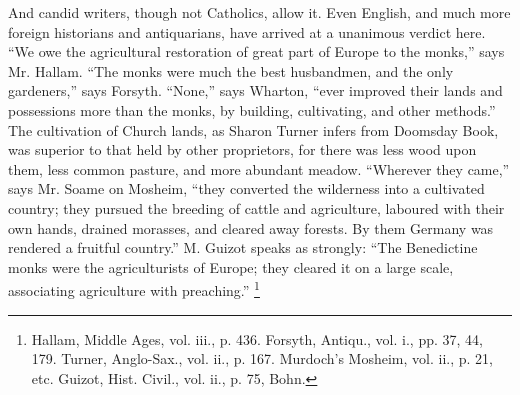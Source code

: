 And candid writers, though not Catholics, allow it. Even English,
and much more foreign historians and antiquarians, have arrived at a
unanimous verdict here. ``We owe the agricultural restoration of
great part of Europe to the monks,'' says Mr. Hallam. ``The
monks were much the best husbandmen, and the only gardeners,''
says Forsyth. ``None,'' says Wharton, ``ever improved
their lands and possessions more than the monks, by building,
cultivating, and other methods.'' The cultivation of Church lands,
as Sharon Turner infers from Doomsday Book, was superior to that held
by other proprietors, for there was less wood upon them, less common
pasture, and more abundant meadow. ``Wherever they came,''
says Mr. Soame on Mosheim, ``they converted the wilderness into a
cultivated country; they pursued the breeding of cattle and
agriculture, laboured with their own hands, drained morasses, and
cleared away forests. By them Germany was rendered a fruitful
country.'' M. Guizot speaks as strongly: ``The Benedictine
monks were the agriculturists of Europe; they cleared it on a large
scale, associating agriculture with preaching.'' \footnote{Hallam,
Middle Ages, vol. iii., p. 436. Forsyth, Antiqu., vol. i., pp. 37, 44,
179. Turner, Anglo-Sax., vol. ii., p. 167. Murdoch's Mosheim, vol.
ii., p. 21, etc. Guizot, Hist. Civil., vol. ii., p. 75, Bohn.}

